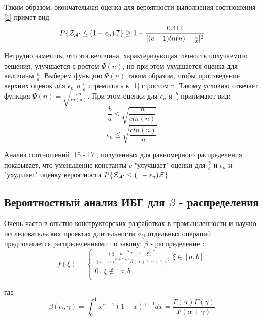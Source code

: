 \documentclass[a4paper, 14pt]{extarticle}
\numberwithin{equation}{section}
\begin{document}
Таким образом, окончательная оценка для вероятности выполнения соотношения \eqref{1} примет вид:
\begin{equation}\label{15}
P \{ \text{$\mathcal{Z_{A'}}$} \leq (1+\epsilon_n)\mathcal{Z} \} \geq 1 - \frac{0.417}{[(c-1)ln(n)-\frac{1}{2}]^2}
\end{equation}

Нетрудно заметить, что эта величина, характеризующая точность получаемого решения, улучшается с ростом $\Psi(n)$, но при этом ухудшается оценка для величины $\frac{b}{a}$. Выберем функцию $\Psi(n)$ таким образом, чтобы произведение верхних оценок для $\epsilon_n$ и $\frac{b}{a}$ стремилось к \eqref{1} с ростом n. Такому условию отвечает функция $\Psi(n) = \sqrt{\frac{cn}{ln(n)}}$. При этом оценки для $\epsilon_n$ и $\frac{b}{a}$ принимают вид:
\begin{equation}\label{16}
\frac{b}{a} \leq \sqrt{\frac{n}{cln(n)}}
\end{equation}
\begin{equation}\label{17}
\epsilon_n \leq \sqrt{\frac{cln(n)}{n}}
\end{equation}

Анализ соотношений \ref{15}-\ref{17}, полученных для равномерного распределения показывает, что уменьшение константы $c$ "улучшает" оценки для $\frac{b}{a}$ и $\epsilon_n$ и "ухудшает" оценку вероятности $P \{ \text{$\mathcal{Z_{A'}}$} \leq (1+\epsilon_n)\mathcal{Z} \}$\\


\subsection{Вероятностный анализ ИБГ для $\beta$ - распределения}


 Очень часто в опытно-конструкторских разработках в промышленности и научно-исследовательских проектах длительности $a_{ij}$ отдельных операций предполагается распределенными по закону: $\beta$ - распределение :
\begin{equation}
f(\xi) = 
\begin{cases}
   \frac{(\xi-a)^\alpha*(b-\xi)^\gamma}{(b-a)^{\alpha+\gamma+1} \beta(\alpha+1, \gamma+1)},  \; \xi \in [a,b]\\
   0, \; \xi \notin [a,b] \\
 \end{cases}
\end{equation}

где
\begin{equation}
\beta(\alpha, \gamma) = \int_0^1 x^{\alpha-1} (1-x)^{\gamma-1} dx = \frac{\Gamma(\alpha)\Gamma(\gamma)}{F(\alpha+\gamma)}
\end{equation}
\end{document}

